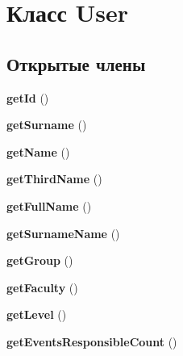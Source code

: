 \hypertarget{class_user}{}\section{Класс User}
\label{class_user}
\subsection*{Открытые члены}
\begin{DoxyCompactItemize}
\item 
\mbox{\label{class_user_a12251d0c022e9e21c137a105ff683f13}} 
{\bfseries get\+Id} ()
\item 
\mbox{\label{class_user_a8e1a01c7b21ec79c38e7d8e6b939ce27}} 
{\bfseries get\+Surname} ()
\item 
\mbox{\label{class_user_a3d0963e68bb313b163a73f2803c64600}} 
{\bfseries get\+Name} ()
\item 
\mbox{\label{class_user_a5e2103a61108304fcd718a517884ab5d}} 
{\bfseries get\+Third\+Name} ()
\item 
\mbox{\label{class_user_a2b284f11184201a8ba8a92de57f93580}} 
{\bfseries get\+Full\+Name} ()
\item 
\mbox{\label{class_user_a0cbfea8f34063f74136aa05476ba4107}} 
{\bfseries get\+Surname\+Name} ()
\item 
\mbox{\label{class_user_a4f44e7bc9de772c21b4304d11e87bf16}} 
{\bfseries get\+Group} ()
\item 
\mbox{\label{class_user_a934da130b87be052e8aa73da8fd4fc95}} 
{\bfseries get\+Faculty} ()
\item 
\mbox{\label{class_user_a23fac327059bf3fd0fe57555252d8cf2}} 
{\bfseries get\+Level} ()
\item 
\mbox{\label{class_user_addca40e39caf569a9e7294803abb91cb}} 
{\bfseries get\+Events\+Responsible\+Count} ()
\item 
\mbox{\label{class_user_a91798b61f6df8d4c58338662c2fa3dd2}} 

\end{DoxyCompactItemize}
